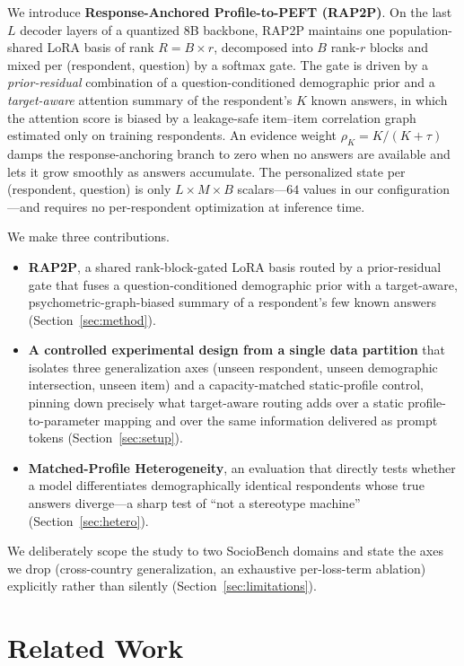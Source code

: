 \documentclass[letterpaper]{article} %
\begin{document}
We introduce \textbf{Response-Anchored Profile-to-PEFT (RAP2P)}. On the last
$L$ decoder layers of a quantized $8$B backbone, RAP2P maintains one
population-shared LoRA basis of rank $R=B\times r$, decomposed into $B$
rank-$r$ blocks and mixed per (respondent, question) by a softmax gate. The
gate is driven by a \emph{prior-residual} combination of a
question-conditioned demographic prior and a \emph{target-aware}
attention summary of the respondent's $K$ known answers, in which the
attention score is biased by a leakage-safe item--item correlation graph
estimated only on training respondents. An evidence weight
$\rho_K = K/(K+\tau)$ damps the response-anchoring branch to zero when no
answers are available and lets it grow smoothly as answers accumulate. The
personalized state per (respondent, question) is only $L\times M\times B$
scalars---$64$ values in our configuration---and requires no per-respondent
optimization at inference time.

We make three contributions.
\begin{itemize}
\item \textbf{RAP2P}, a shared rank-block-gated LoRA basis routed by a
prior-residual gate that fuses a question-conditioned demographic prior with a
target-aware, psychometric-graph-biased summary of a respondent's few known
answers (Section~\ref{sec:method}).
\item \textbf{A controlled experimental design from a single data partition}
that isolates three generalization axes (unseen respondent, unseen demographic
intersection, unseen item) and a capacity-matched static-profile control,
pinning down precisely what target-aware routing adds over a static
profile-to-parameter mapping and over the same information delivered as prompt
tokens (Section~\ref{sec:setup}).
\item \textbf{Matched-Profile Heterogeneity}, an evaluation that directly
tests whether a model differentiates demographically identical respondents
whose true answers diverge---a sharp test of ``not a stereotype machine''
(Section~\ref{sec:hetero}).
\end{itemize}

We deliberately scope the study to two SocioBench domains and state the axes we
drop (cross-country generalization, an exhaustive per-loss-term ablation)
explicitly rather than silently (Section~\ref{sec:limitations}).

\section{Related Work}
\label{sec:related}
\end{document}
